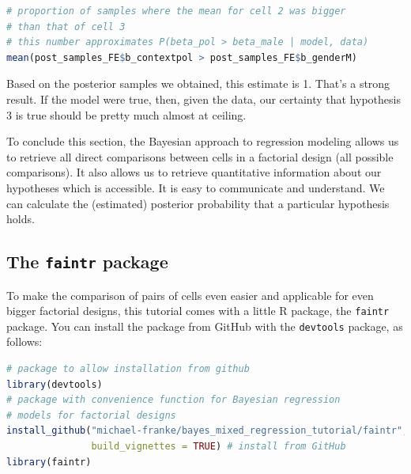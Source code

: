 \documentclass[nobib]{tufte-handout}
\begin{document}
\begin{minipage}[]{1.1\textwidth}
\begin{lstlisting}[language=R]
# proportion of samples where the mean for cell 2 was bigger 
# than that of cell 3 
# this number approximates P(beta_pol > beta_male | model, data)
mean(post_samples_FE$b_contextpol > post_samples_FE$b_genderM)
\end{lstlisting}
\end{minipage}

Based on the posterior samples we obtained, this estimate is 1. That's a strong result. If the model were true, then, given the data, our certainty that hypothesis 3 is true should be pretty much almost at ceiling.

To conclude this section, the Bayesian approach to regression modeling allows us to retrieve all direct comparisons between cells in a factorial design (all possible comparisons). It also allows us to retrieve quantitative information about our hypotheses which is accessible. It is easy to communicate and understand. We can calculate the (estimated) posterior probability that a particular hypothesis holds. %

\subsection{The \texttt{faintr} package}

To make the comparison of pairs of cells even easier and applicable for even bigger factorial designs, this tutorial comes with a little R package, the \texttt{faintr} package.
%
%
You can install the package from GitHub with the \texttt{devtools} package, as follows:

\begin{minipage}[]{1.3\textwidth}
\begin{lstlisting}[language=R]
# package to allow installation from github
library(devtools)
# package with convenience function for Bayesian regression 
# models for factorial designs
install_github("michael-franke/bayes_mixed_regression_tutorial/faintr", 
               build_vignettes = TRUE) # install from GitHub
library(faintr)
\end{lstlisting}
\end{minipage}
\end{document}
